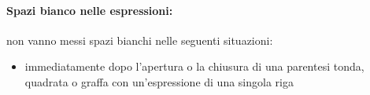 \documentclass[../processi_primari.tex]{subfiles}
\begin{document}
\paragraph*{Spazi bianco nelle espressioni: }
non vanno messi spazi bianchi nelle seguenti situazioni:

\begin{itemize}
	\item immediatamente dopo l'apertura o la chiusura di una parentesi tonda, quadrata o graffa con un'espressione di una singola riga
\end{itemize}
\end{document}
